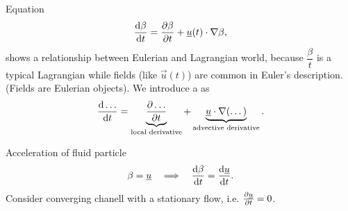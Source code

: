 \documentclass[../main.tex]{subfiles}
\begin{document}
    Equation 
    \begin{equation}
      \frac{\mathrm{d} \beta}{\mathrm{d} t} = \frac{\partial \beta}{\partial t} + \underline{u}(t) \cdot \nabla \beta,
      \label{eq:1}
    \end{equation}
    shows a relationship between Eulerian and Lagrangian world, because
    $\dfrac{\beta}{t}$ is a typical Lagrangian while fields (like $\vec u(t)$) are common in Euler's description.
    (Fields are Eulerian objects).
    We introduce a  as 
    \begin{displaymath}
      \frac{\mathrm{d} \dots}{\mathrm{d} t} = \underbrace{\frac{\partial \dots}{\partial t}}_{\textrm{local derivative}} + \underbrace{\underline{u} \cdot \nabla(\dots)}_{\textrm{advective derivative}}.
    \end{displaymath}
    
    Acceleration of fluid particle
    \begin{displaymath}
      \beta = \underline{u} \quad \Longrightarrow \quad \frac{\mathrm{d} \beta}{\mathrm{d} t} = \frac{\mathrm{d} \underline{u}}{\mathrm{d} t}.
    \end{displaymath}
    Consider converging chanell with a stationary flow, i.e. $\frac{\partial \underline{u}}{\partial t} = 0$.


    \begin{figure}
      \centering
      \label{fig:1.9}
    \end{figure}

    
\end{document}
